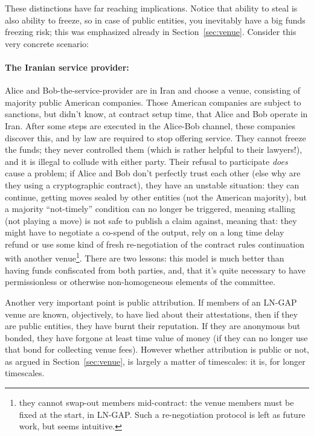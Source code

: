 \documentclass[11pt]{article}
\begin{document}
These distinctions have far reaching implications. Notice that ability to steal is also ability to freeze, so in case of public entities, you inevitably have a big funds freezing risk; this was emphasized already in Section~\ref{sec:venue}. Consider this very concrete scenario:

\paragraph{The Iranian service provider:} Alice and Bob-the-service-provider are in Iran and choose a venue, consisting of majority public American companies. Those American companies are subject to sanctions, but didn't know, at contract setup time, that Alice and Bob operate in Iran. After some steps are executed in the Alice-Bob channel, these companies discover this, and by law are required to stop offering service. They cannot freeze the funds; they never controlled them (which is rather helpful to their lawyers!), and it is illegal to collude with either party. Their refusal to participate \emph{does} cause a problem; if Alice and Bob don't perfectly trust each other (else why are they using a cryptographic contract), they have an unstable situation: they can continue, getting moves sealed by other entities (not the American majority), but a majority ``not-timely'' condition can no longer be triggered, meaning stalling (not playing a move) is not safe to publish a claim against, meaning that: they might have to negotiate a co-spend of the output, rely on a long time delay refund or use some kind of fresh re-negotiation of the contract rules continuation with another venue\footnote{they cannot swap-out members mid-contract: the venue members must be fixed at the start, in LN-GAP. Such a re-negotiation protocol is left as future work, but seems intuitive.}. There are two lessons: this model is much better than having funds confiscated from both parties, and, that it's quite necessary to have permissionless or otherwise non-homogeneous elements of the committee.

Another very important point is public attribution. If members of an LN-GAP venue are known, objectively, to have lied about their attestations, then if they are public entities, they have burnt their reputation. If they are anonymous but bonded, they have forgone at least time value of money (if they can no longer use that bond for collecting venue fees). However whether attribution is public or not, as argued in Section~\ref{sec:venue}, is largely a matter of timescales: it is, for longer timescales.
\end{document}
